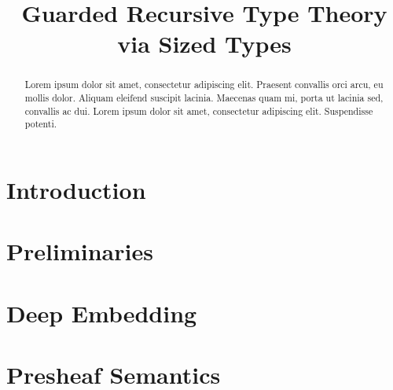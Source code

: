 \documentclass[a4paper,UKenglish,cleveref, autoref,numberwithinsect]{lipics-v2018}
\title{Guarded Recursive Type Theory via Sized Types}
\begin{document}
\maketitle

\begin{abstract}
Lorem ipsum dolor sit amet, consectetur adipiscing elit. Praesent convallis orci arcu, eu mollis dolor. Aliquam eleifend suscipit lacinia. Maecenas quam mi, porta ut lacinia sed, convallis ac dui. Lorem ipsum dolor sit amet, consectetur adipiscing elit. Suspendisse potenti. 
 \end{abstract}

\section{Introduction}
\cite{atkey2013productive}

\section{Preliminaries}



\section{Deep Embedding}


\section{Presheaf Semantics}
\end{document}

